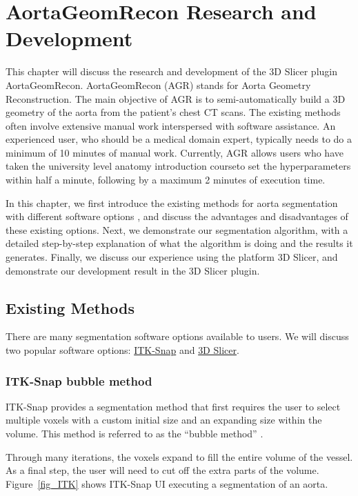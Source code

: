 \chapter{AortaGeomRecon Research and Development}

This chapter will discuss the research and development of the 3D Slicer plugin AortaGeomRecon. AortaGeomRecon (AGR) stands for Aorta Geometry Reconstruction. The main objective of AGR is to semi-automatically build a 3D geometry of the aorta from the patient's chest CT scans.  The existing methods often involve extensive manual work interspersed with software assistance. An experienced user, who should be a medical domain expert, typically needs to do a minimum of 10 minutes of manual work. Currently, AGR allows users who have taken the university level anatomy introduction courseto set the hyperparameters within half a minute, following by a maximum 2 minutes of execution time.

In this chapter, we first introduce the existing methods for aorta segmentation with different software options , and discuss the advantages and disadvantages of these existing options. Next, we demonstrate our segmentation algorithm, with a detailed step-by-step explanation of what the algorithm is doing and the results it generates. Finally, we discuss our experience using the platform 3D Slicer, and demonstrate our development result in the 3D Slicer plugin.

\section{Existing Methods}
There are many segmentation software options available to users. We will discuss two popular software options: \href{https://www.itksnap.org/}{ITK-Snap} and \href{https://www.slicer.org/}{3D Slicer}.

\subsection{ITK-Snap bubble method} 
ITK-Snap provides a segmentation method that first requires the user to select multiple voxels with a custom initial size and an expanding size within the volume. This method is referred to as the ``bubble method'' \cite{gerig}.

Through many iterations, the voxels expand to fill the entire volume of the vessel. As a final step, the user will need to cut off the extra parts of the volume. Figure~\ref{fig_ITK} shows ITK-Snap UI executing a segmentation of an aorta.

